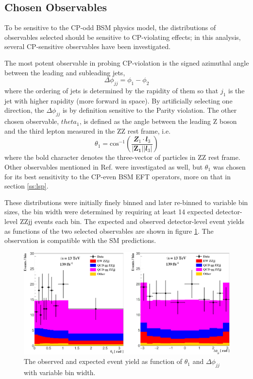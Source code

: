 \documentclass[a4paper,12pt]{article}
\begin{document}
		\subsection{Chosen Observables} \label{ss:observables}
			\par To be sensitive to the CP-odd BSM physics model, the distributions of observables selected should be 
			sensitive to CP-violating effects; in this analysis, several CP-sensitive observables have been investigated.
			\par The most potent observable in probing CP-violation is the signed azimuthal angle between the leading and 
			subleading jets\cite{Bernlochner_2019},
			\begin{equation}\label{eq:dpjj}
				\Delta\phi_{jj} = \phi_{1} - \phi_{2}
			\end{equation}
			where the ordering of jets is determined by the rapidity of them so that $j_1$ is the jet with higher rapidity
			(more forward in space). By artificially selecting one direction, the $\Delta\phi_{jj}$ is by definition sensitive to 
			the Parity violation\cite{PhysRev.105.1413}.
			The other chosen observable, $theta_1$\cite{Bolognesi_2012}, is defined as the angle between the leading Z boson and the third lepton 
			measured in the ZZ rest frame, i.e.
			\begin{equation}\label{eq:the1}\theta_1 = \text{cos}^{-1}(\frac{\mathbfit{Z_1\cdot l_3}}{\mathbfit{|\mathbf{Z_1}||\mathbfit{l_3}|}})\end{equation}
			where the bold character denotes the three-vector of particles in ZZ rest frame. Other observables mentioned 
			in Ref. \cite{Bolognesi_2012} were investigated as well, but $\theta_1$ was chosen for its best 
			sensitivity to the CP-even BSM EFT operators, more on that in section \ref{ss:lsp}.
			\par These distributions were initially finely binned and later re-binned to variable bin sizes, the bin width 
			were determined by requiring at least 14 expected detector-level ZZjj events each bin. The expected and observed detector-level 
			event yields as functions of the two selected observables are shown in figure \ref{fig:Evtyields}. The observation is compatible 
			with the SM predictions.
			\begin{figure}[ht]
				\begin{centering}
				\includegraphics[scale=0.673]{figures/binyields.png}
				\caption{The observed and expected event yield as function of $\theta_1$ and $\Delta\phi_{jj}$ with variable bin width.}
				\label{fig:Evtyields}
				\end{centering}
			\end{figure}
\end{document}
